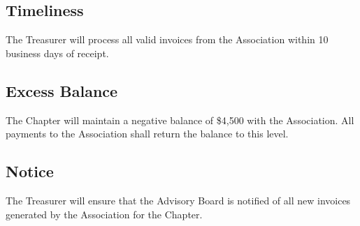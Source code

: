 
\subsection{Timeliness} \label{IX.1}
The Treasurer will process all valid invoices from the Association within 10 business days of receipt.

\subsection{Excess Balance} \label{IX.2}
The Chapter will maintain a negative balance of \$4,500 with the Association. All payments to the Association shall return the balance to this level.

\subsection{Notice} \label{IX.3}
The Treasurer will ensure that the Advisory Board is notified of all new invoices generated by the Association for the Chapter.